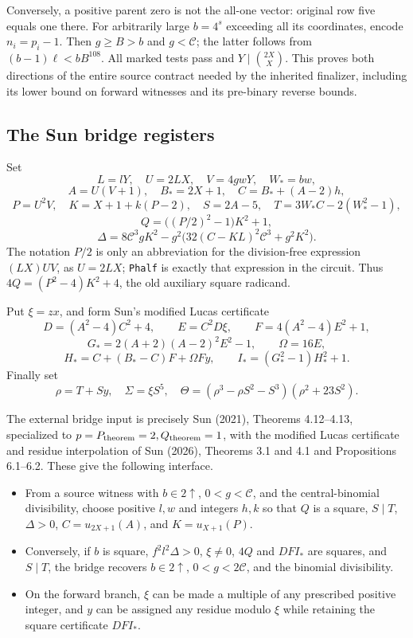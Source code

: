 Conversely, a positive parent zero is not the all-one vector: original
row five equals one there. For arbitrarily large $b=4^s$ exceeding all
its coordinates, encode $n_i=p_i-1$. Then $g\ge B>b$ and $g<\mathcal C$;
the latter follows from $(b-1)\ell<bB^{108}$. All marked tests pass and
$Y\mid\binom{2X}{X}$. This proves both directions of the entire source
contract needed by the inherited finalizer, including its lower bound on
forward witnesses and its pre-binary reverse bounds.

\subsection{The Sun bridge registers}\label{the-sun-bridge-registers}

Set \[
 L=lY,\quad U=2LX,\quad V=4gwY,\quad W_*=bw,
\] \[
 A=U(V+1),\quad B_*=2X+1,\quad C=B_*+(A-2)h,
\] \[
 P=U^2V,\quad K=X+1+k(P-2),\quad
 S=2A-5,\quad T=3W_*C-2(W_*^2-1),
\] \[
 Q=\bigl((P/2)^2-1\bigr)K^2+1,
\] \[
 \Delta=8\mathcal C^3gK^2-
 g^2\bigl(32(C-KL)^2\mathcal C^3+g^2K^2\bigr).
\] The notation \(P/2\) is only an abbreviation for the division-free
expression \((LX)UV\), as \(U=2LX\); \texttt{Phalf} is exactly that
expression in the circuit. Thus \(4Q=(P^2-4)K^2+4\), the old auxiliary
square radicand.

Put \(\xi=zx\), and form Sun's modified Lucas certificate \[
 D=(A^2-4)C^2+4,\qquad E=C^2D\xi,\qquad
 F=4(A^2-4)E^2+1,
\] \[
 G_*=2(A+2)(A-2)^2E^2-1,\qquad \Omega=16E,
\] \[
 H_*=C+(B_*-C)F+\Omega Fy,\qquad I_*=(G_*^2-1)H_*^2+1.
\] Finally set \[
 \rho=T+Sy,\quad \Sigma=\xi S^5,\quad
 \Theta=(\rho^3-\rho S^2-S^3)(\rho^2+23S^2).
\]

The external bridge input is precisely Sun (2021), Theorems 4.12--4.13,
specialized to \(p=P_{\rm theorem}=2,Q_{\rm theorem}=1\), with the
modified Lucas certificate and residue interpolation of Sun (2026),
Theorems 3.1 and 4.1 and Propositions 6.1--6.2. These give the following
interface.

\begin{itemize}
\item
  From a source witness with \(b\in2\uparrow\), \(0<g<\mathcal C\), and
  the central-binomial divisibility, choose positive \(l,w\) and
  integers \(h,k\) so that \(Q\) is a square, \(S\mid T\), \(\Delta>0\),
  \(C=u_{2X+1}(A)\), and \(K=u_{X+1}(P)\).
\item
  Conversely, if \(b\) is square, \(f^2l^2\Delta>0\), \(\xi\ne0\),
  \(4Q\) and \(DFI_*\) are squares, and \(S\mid T\), the bridge recovers
  \(b\in2\uparrow\), \(0<g<2\mathcal C\), and the binomial divisibility.
\item
  On the forward branch, \(\xi\) can be made a multiple of any
  prescribed positive integer, and \(y\) can be assigned any residue
  modulo \(\xi\) while retaining the square certificate \(DFI_*\).
\end{itemize}

